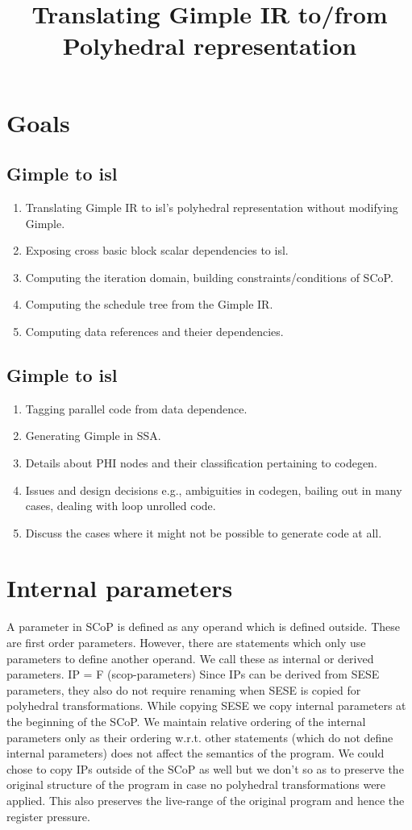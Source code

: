 \title{Translating Gimple IR to/from Polyhedral representation}

\section{Goals}
\subsection{Gimple to isl}
\begin{enumerate}
    \item Translating Gimple IR to isl's polyhedral representation without modifying Gimple.
    \item Exposing cross basic block scalar dependencies to isl.
    \item Computing the iteration domain, building constraints/conditions of SCoP.
    \item Computing the schedule tree from the Gimple IR.
    \item Computing data references and theier dependencies.
\end{enumerate}

\subsection{Gimple to isl}
\begin{enumerate}
    \item Tagging parallel code from data dependence.
    \item Generating Gimple in SSA.
    \item Details about PHI nodes and their classification pertaining to codegen.
    \item Issues and design decisions e.g., ambiguities in codegen, bailing out in many cases, dealing with loop unrolled code.
    \item Discuss the cases where it might not be possible to generate code at all.
\end{enumerate}

\section{Internal parameters}
A parameter in SCoP is defined as any operand which is defined outside. These are first order parameters.
However, there are statements which only use parameters to define another operand. We call these as internal or
derived parameters.
IP = F (scop-parameters)
Since IPs can be derived from SESE parameters, they also do not require renaming when SESE is copied for polyhedral
transformations. While copying SESE we copy internal parameters at the beginning of the SCoP.
We maintain relative ordering of the internal parameters only as their ordering w.r.t. other
statements (which do not define internal parameters) does not affect the semantics of the program.
We could chose to copy IPs outside of the SCoP as well but we don't so as to preserve the original structure of the
program in case no polyhedral transformations were applied. This also preserves the live-range
of the original program and hence the register pressure.


